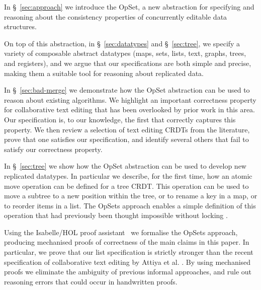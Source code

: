 \documentclass[11pt]{article}
\begin{document}
\begin{itemize*}
\item In \S~\ref{sec:approach} we introduce the OpSet, a new abstraction for specifying and reasoning about the consistency properties of concurrently editable data structures.

\item On top of this abstraction, in \S~\ref{sec:datatypes} and \S~\ref{sec:tree}, we specify a variety of composable abstract datatypes (maps, sets, lists, text, graphs, trees, and registers), and we argue that our specifications are both simple and precise, making them a suitable tool for reasoning about replicated data.

\item In \S~\ref{sec:bad-merge} we demonstrate how the OpSet abstraction can be used to reason about existing algorithms. We highlight an important correctness property for collaborative text editing that has been overlooked by prior work in this area.
Our specification is, to our knowledge, the first that correctly captures this property.
We then review a selection of text editing CRDTs from the literature, prove that one satisfies our specification, and identify several others that fail to satisfy our correctness property.

\item In \S~\ref{sec:tree} we show how the OpSet abstraction can be used to develop new replicated datatypes. In particular we describe, for the first time, how an atomic move operation can be defined for a tree CRDT.
This operation can be used to move a subtree to a new position within the tree, or to rename a key in a map, or to reorder items in a list.
The OpSets approach enables a simple definition of this operation that had previously been thought impossible without locking \cite{Najafzadeh:2017vk}.

\item Using the Isabelle/HOL proof assistant~\cite{DBLP:conf/tphol/WenzelPN08} we formalise the OpSets approach, producing mechanised proofs of correctness of the main claims in this paper.
In particular, we prove that our list specification is strictly stronger than the recent specification of collaborative text editing by Attiya et al. \cite{Attiya:2016kh}.
By using mechanised proofs we eliminate the ambiguity of previous informal approaches, and rule out reasoning errors that could occur in handwritten proofs.
\end{itemize*}






\end{document}
